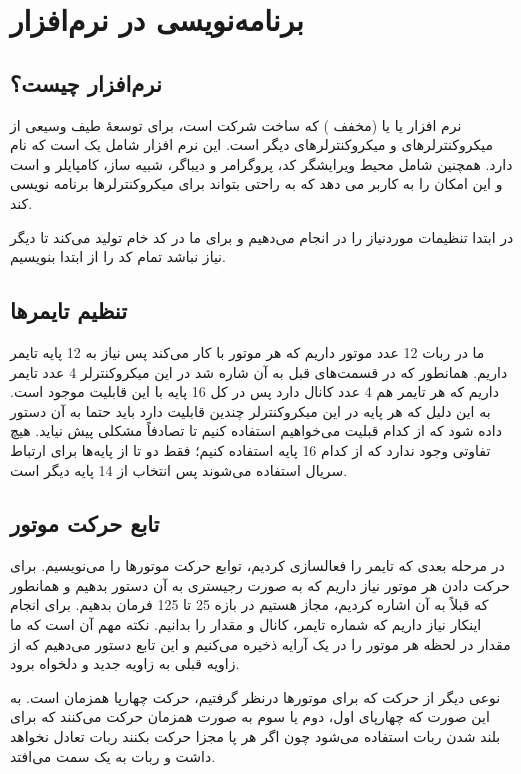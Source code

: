 \section{برنامه‌نویسی در نرم‌افزار }
\subsection{نرم‌افزار  چیست؟}
نرم افزار  یا  یا  (مخفف ) که ساخت شرکت  است، برای توسعۀ طیف وسیعی از میکروکنترلرهای  و میکروکنترلرهای دیگر است. این نرم افزار شامل یک  است که  نام دارد. همچنین شامل محیط ویرایشگر کد، پروگرامر و دیباگر، شبیه ساز، کامپایلر و  است و این امکان را به کاربر می دهد که به راحتی بتواند برای میکروکنترلرها برنامه نویسی کند.

در ابتدا تنظیمات موردنیاز را در  انجام می‌دهیم و برای ما در  کد خام تولید می‌کند تا دیگر نیاز نباشد تمام کد را از ابتدا بنویسیم.
\subsection{تنظیم تایمرها}
ما در ربات 12 عدد موتور داریم که هر موتور با  کار می‌کند پس نیاز به 12 پایه تایمر داریم. همانطور که در قسمت‌های قبل به آن شاره شد در این میکروکنترلر 4 عدد تایمر داریم که هر تایمر هم 4 عدد کانال دارد پس در کل 16 پایه با این قابلیت موجود است. به این دلیل که هر پایه در این میکروکنترلر چندین قابلیت دارد باید حتما به آن دستور داده شود که از کدام قبلیت می‌خواهیم استفاده کنیم تا تصادفاً مشکلی پیش نیاید. هیچ تفاوتی وجود ندارد که از کدام 16 پایه استفاده کنیم؛ فقط دو تا از پایه‌ها برای ارتباط سریال استفاده می‌شوند پس انتخاب از 14 پایه دیگر است.
\begin{latin}
	
\end{latin}
\subsection{تابع حرکت موتور}
در مرحله بعدی که تایمر را فعالسازی کردیم، توابع حرکت موتورها را می‌نویسیم. برای حرکت دادن هر موتور نیاز داریم که به صورت رجیستری به آن دستور بدهیم و همانطور که قبلاً به آن اشاره کردیم، مجاز هستیم در بازه 25 تا 125 فرمان بدهیم. برای انجام اینکار نیاز داریم که شماره تایمر، کانال و مقدار  را بدانیم. نکته مهم آن است که ما مقدار در لحظه هر موتور را در یک آرایه ذخیره می‌کنیم و این تابع دستور می‌دهیم که از زاویه قبلی به زاویه جدید و دلخواه برود. 
\begin{latin}
	
\end{latin}
نوعی دیگر از حرکت که برای موتورها درنظر گرفتیم، حرکت چهارپا همزمان است. به این صورت که چهارپای اول، دوم یا سوم به صورت همزمان حرکت می‌‌کنند که برای بلند شدن ربات استفاده می‌شود چون اگر هر پا مجزا حرکت بکنند ربات تعادل نخواهد داشت و ربات به یک سمت می‌افتد.
\begin{latin}
	
\end{latin}
